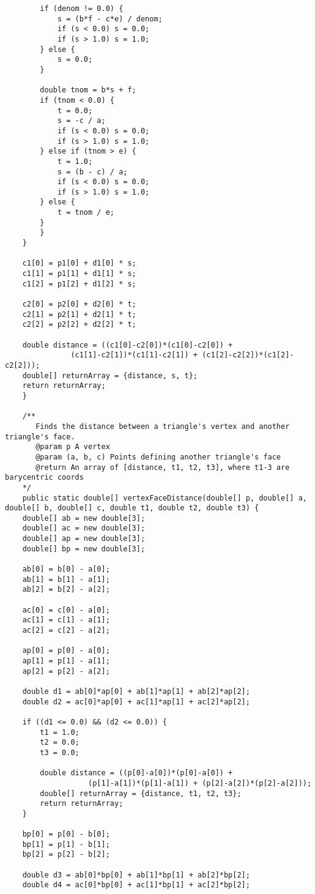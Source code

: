 \begin{lstlisting}
		if (denom != 0.0) {
		    s = (b*f - c*e) / denom;
		    if (s < 0.0) s = 0.0;
		    if (s > 1.0) s = 1.0;
		} else {
		    s = 0.0;
		}

		double tnom = b*s + f;
		if (tnom < 0.0) {
		    t = 0.0;
		    s = -c / a;
		    if (s < 0.0) s = 0.0;
		    if (s > 1.0) s = 1.0;
		} else if (tnom > e) {
		    t = 1.0;
		    s = (b - c) / a;
		    if (s < 0.0) s = 0.0;
		    if (s > 1.0) s = 1.0;
		} else {
		    t = tnom / e;
		}
	    }
	}
	
	c1[0] = p1[0] + d1[0] * s;
	c1[1] = p1[1] + d1[1] * s;
	c1[2] = p1[2] + d1[2] * s;

	c2[0] = p2[0] + d2[0] * t;
	c2[1] = p2[1] + d2[1] * t;
	c2[2] = p2[2] + d2[2] * t;

	double distance = ((c1[0]-c2[0])*(c1[0]-c2[0]) +
			   (c1[1]-c2[1])*(c1[1]-c2[1]) + (c1[2]-c2[2])*(c1[2]-c2[2]));
	double[] returnArray = {distance, s, t};
	return returnArray;
    }

    /**
       Finds the distance between a triangle's vertex and another triangle's face.
       @param p A vertex
       @param (a, b, c) Points defining another triangle's face
       @return An array of [distance, t1, t2, t3], where t1-3 are barycentric coords
    */
    public static double[] vertexFaceDistance(double[] p, double[] a, double[] b, double[] c, double t1, double t2, double t3) {
	double[] ab = new double[3];
	double[] ac = new double[3];
	double[] ap = new double[3];
	double[] bp = new double[3];

	ab[0] = b[0] - a[0];
	ab[1] = b[1] - a[1];
	ab[2] = b[2] - a[2];

	ac[0] = c[0] - a[0];
	ac[1] = c[1] - a[1];
	ac[2] = c[2] - a[2];

	ap[0] = p[0] - a[0];
	ap[1] = p[1] - a[1];
	ap[2] = p[2] - a[2];
	
	double d1 = ab[0]*ap[0] + ab[1]*ap[1] + ab[2]*ap[2];
	double d2 = ac[0]*ap[0] + ac[1]*ap[1] + ac[2]*ap[2];

	if ((d1 <= 0.0) && (d2 <= 0.0)) {
	    t1 = 1.0;
	    t2 = 0.0;
	    t3 = 0.0;
	    
	    double distance = ((p[0]-a[0])*(p[0]-a[0]) +
			       (p[1]-a[1])*(p[1]-a[1]) + (p[2]-a[2])*(p[2]-a[2]));
	    double[] returnArray = {distance, t1, t2, t3};
	    return returnArray;
	}
	
	bp[0] = p[0] - b[0];
	bp[1] = p[1] - b[1];
	bp[2] = p[2] - b[2];

	double d3 = ab[0]*bp[0] + ab[1]*bp[1] + ab[2]*bp[2];
	double d4 = ac[0]*bp[0] + ac[1]*bp[1] + ac[2]*bp[2];


\end{lstlisting}
